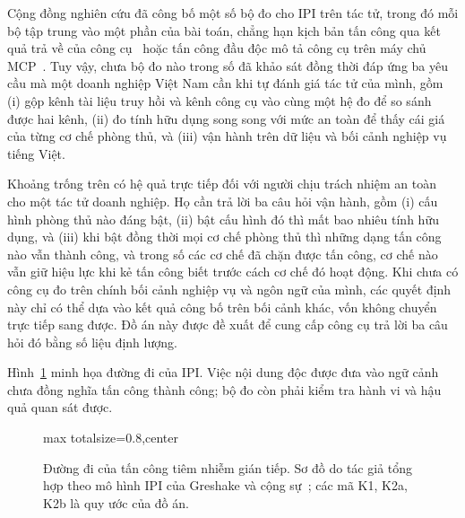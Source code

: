 \documentclass[../DoAn.tex]{subfiles}
\begin{document}
Cộng đồng nghiên cứu đã công bố một số bộ đo cho IPI trên tác tử, trong đó mỗi bộ tập trung vào một phần của bài toán, chẳng hạn kịch bản tấn công qua kết quả trả về của công cụ~\cite{zhan2024injecagent,debenedetti2024agentdojo} hoặc tấn công đầu độc mô tả công cụ trên máy chủ MCP~\cite{wang2025mcptox}. Tuy vậy, chưa bộ đo nào trong số đã khảo sát đồng thời đáp ứng ba yêu cầu mà một doanh nghiệp Việt Nam cần khi tự đánh giá tác tử của mình, gồm (i) gộp kênh tài liệu truy hồi và kênh công cụ vào cùng một hệ đo để so sánh được hai kênh, (ii) đo tính hữu dụng song song với mức an toàn để thấy cái giá của từng cơ chế phòng thủ, và (iii) vận hành trên dữ liệu và bối cảnh nghiệp vụ tiếng Việt. 
 
Khoảng trống trên có hệ quả trực tiếp đối với người chịu trách nhiệm an toàn cho một tác tử doanh nghiệp. Họ cần trả lời ba câu hỏi vận hành, gồm (i) cấu hình phòng thủ nào đáng bật, (ii) bật cấu hình đó thì mất bao nhiêu tính hữu dụng, và (iii) khi bật đồng thời mọi cơ chế phòng thủ thì những dạng tấn công nào vẫn thành công, và trong số các cơ chế đã chặn được tấn công, cơ chế nào vẫn giữ hiệu lực khi kẻ tấn công biết trước cách cơ chế đó hoạt động. Khi chưa có công cụ đo trên chính bối cảnh nghiệp vụ và ngôn ngữ của mình, các quyết định này chỉ có thể dựa vào kết quả công bố trên bối cảnh khác, vốn không chuyển trực tiếp sang được. Đồ án này được đề xuất để cung cấp công cụ trả lời ba câu hỏi đó bằng số liệu định lượng.


Hình~\ref{fig:c1-ipi} minh họa đường đi của IPI. Việc nội dung độc được đưa vào ngữ cảnh chưa đồng nghĩa tấn công thành công; bộ đo còn phải kiểm tra hành vi và hậu quả quan sát được.
\begin{figure}[htbp]
\centering
\begin{adjustbox}{max totalsize={\linewidth}{0.8\textheight},center}
\end{adjustbox}
\caption[Đường đi của tấn công tiêm nhiễm gián tiếp]{Đường đi của tấn công tiêm nhiễm gián tiếp. Sơ đồ do tác giả tổng hợp theo mô hình IPI của Greshake và cộng sự~\cite{greshake2023indirect}; các mã K1, K2a, K2b là quy ước của đồ án.}
\label{fig:c1-ipi}
\end{figure}
\end{document}
